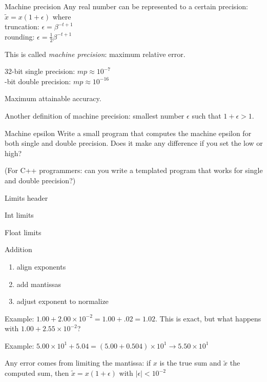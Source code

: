 \begin{numberedframe}{Machine precision}
  Any real number can be represented to a certain precision:
  $\tilde x=x(1+\epsilon)$ where\\
  truncation: $\epsilon=\beta^{-t+1}$\\
  rounding: $\epsilon=\frac12 \beta^{-t+1}$

  This is called \emph{machine precision}: maximum relative error.

  32-bit single precision: $mp\approx10^{-7}$\\ -bit double precision: $mp\approx10^{-16}$
  
  Maximum attainable accuracy.
  
  Another definition of machine precision: smallest number $\epsilon$ such that
  $1+\epsilon>1$.
\end{numberedframe}

\begin{exerciseframe}{Machine epsilon}
  Write a small program that computes the machine epsilon for both
  single and double precision. Does it
  make any difference if you set the
   low or high? 

  (For C++ programmers: can you write a templated program that works
  for single and double precision?)
\end{exerciseframe}

\begin{numberedframe}{Limits header}
  
\end{numberedframe}

\begin{numberedframe}{Int limits}
  
\end{numberedframe}

\begin{numberedframe}{Float limits}
  
\end{numberedframe}

\begin{numberedframe}{Addition}
  \begin{enumerate}
  \item align exponents
  \item add mantissas
  \item adjust exponent to normalize
  \end{enumerate}

Example: $1.00+2.00\times 10^{-2}=1.00+.02=1.02$. This is exact, but
what happens with $1.00+2.55\times 10^{-2}$?

Example: $5.00\times 10^{1}+5.04=(5.00+0.504)\times10^1
\rightarrow5.50\times10^1$

Any error comes from limiting the mantissa: if $x$ is the true sum
and $\tilde x$ the computed sum, then $\tilde x=x(1+\epsilon)$ with 
$|\epsilon|<10^{-2}$
\end{numberedframe}

